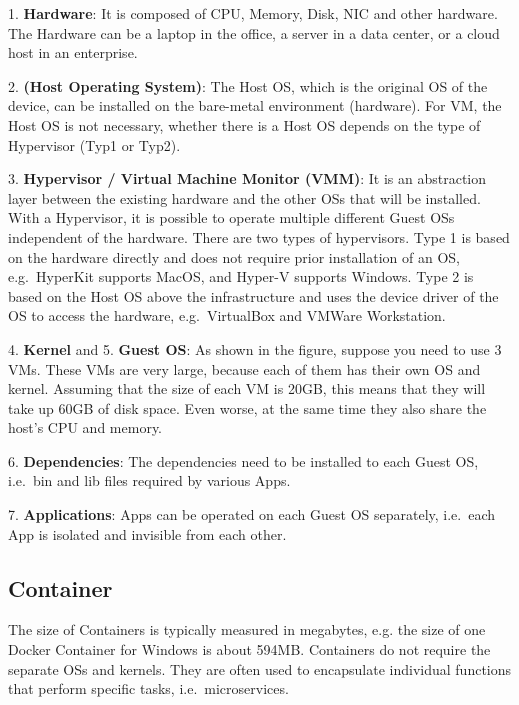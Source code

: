 1.
\textbf{Hardware}:
It is composed of CPU, Memory, Disk, NIC and other hardware.
The Hardware can be a laptop in the office, a server in a data center, or a cloud host in
an enterprise.

2.
\textbf{(Host Operating System)}:
The Host OS, which is the original OS of the device, can be installed on the
bare-metal environment (hardware).
For VM, the Host OS is not necessary, whether there is a Host OS depends on
the type of Hypervisor (Typ1 or Typ2).

3.
\textbf{Hypervisor / Virtual Machine Monitor (VMM)}:
It is an abstraction layer between the existing hardware and the other OSs that
will be installed\cite{b22}.
With a Hypervisor, it is possible to operate multiple different Guest OSs independent
of the hardware.
\newline
There are two types of hypervisors\cite{b25}.
Type 1 is based on the hardware directly and does not require prior installation
of an OS, e.g.\ HyperKit supports MacOS, and Hyper-V supports Windows.
Type 2 is based on the Host OS above the infrastructure and uses the device driver of the
OS to access the hardware, e.g.\ VirtualBox and VMWare Workstation\cite{b22}.

4.
\textbf{Kernel}
and 5.
\textbf{Guest OS}:
As shown in the figure, suppose you need to use 3 VMs.
These VMs are very large, because each of them has their own OS and kernel.
Assuming that the size of each VM is 20GB\cite{b26}, this means that they will take up 60GB
of disk space.
Even worse, at the same time they also share the host's CPU and memory.

6.
\textbf{Dependencies}:
The dependencies need to be installed to each Guest OS, i.e.\ bin and lib files
required by various Apps.

7.
\textbf{Applications}:
Apps can be operated on each Guest OS separately, i.e.\ each
App is isolated and invisible from each other.


\subsection{Container}
The size of Containers is typically measured in megabytes, e.g. the size of one
Docker Container for Windows is about 594MB.\cite{b27}
Containers do not require the separate OSs and kernels.
They are often used to encapsulate individual functions
that perform specific tasks, i.e.\ microservices\cite{b20}.

